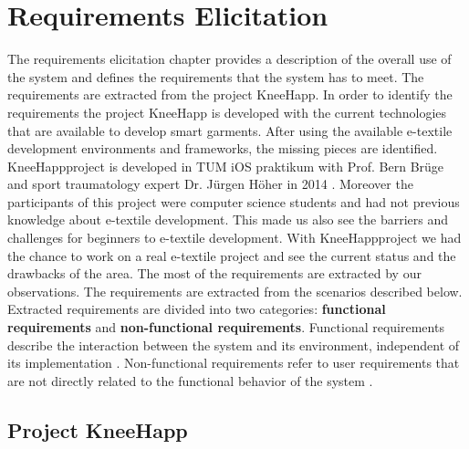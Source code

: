 \def\kneehapp {KneeHapp}


\chapter{Requirements Elicitation}
	
	The requirements elicitation chapter provides a description of the overall use of the system and defines the requirements that the system has to meet. The requirements are extracted from the project \kneehapp. In order to identify the requirements the project KneeHapp is developed with the current technologies that are available to develop smart garments. After using the available e-textile development environments and frameworks, the missing pieces are identified.  \kneehapp  project is developed in TUM iOS praktikum with Prof. Bern Br\"uge and sport traumatology expert Dr. J\"urgen H\"oher in 2014 \cite{19}. Moreover the participants of this project were computer science students and had not previous knowledge about e-textile development. This made us also see the barriers and challenges for beginners to e-textile development. With \kneehapp project we had the chance to work on a real e-textile project and see the current status and the drawbacks of the area. The most of the requirements are extracted by our observations. The requirements are extracted from the scenarios described below. Extracted requirements are divided into two categories: \textbf{functional requirements} and \textbf{non-functional requirements}. Functional requirements describe the interaction between the system and its environment, independent of its implementation \cite{Bruegge2004}. Non-functional requirements refer to user requirements that are not directly related to the functional behavior of the system \cite{Bruegge2004}.

	
\section{Project \kneehapp}

